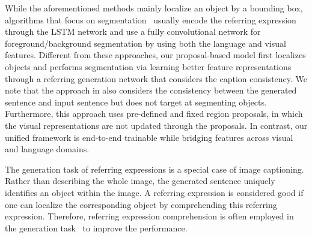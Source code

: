 \documentclass{bmvc2k}
\begin{document}
While the aforementioned methods mainly localize an object by a bounding box, algorithms that focus on segmentation~\cite{Hu_ECCV_2016,Li_CVPR_2018,Liu_ICCV_2017,Shi_ECCV_2018,Margffoy-Tuay_ECCV_2018} usually encode the referring expression through the LSTM network and use a fully convolutional network for foreground/background segmentation by using both the language and visual features.
Different from these approaches, our proposal-based model first localizes objects and performs segmentation via learning better feature representations through a referring generation network that considers the caption consistency.
We note that the approach in \cite{Rohrbach_ECCV_2016} also considers the consistency between the generated sentence and input sentence but does not target at segmenting objects.
Furthermore, this approach uses pre-defined and fixed region proposals, in which the visual representations are not updated through the proposals.
In contrast, our unified framework is end-to-end trainable while bridging features across visual and language domains.









{}
The generation task of referring expressions is a special case of image captioning. 
Rather than describing the whole image, the generated sentence uniquely identifies an object within the image.
A referring expression is considered good if one can localize the corresponding object by comprehending this referring expression.
Therefore, referring expression comprehension is often employed in the generation task~\cite{Mao_CVPR_2016,Liu_ICCV_2017_2,Luo_CVPR_2017} to improve the performance.
\end{document}
